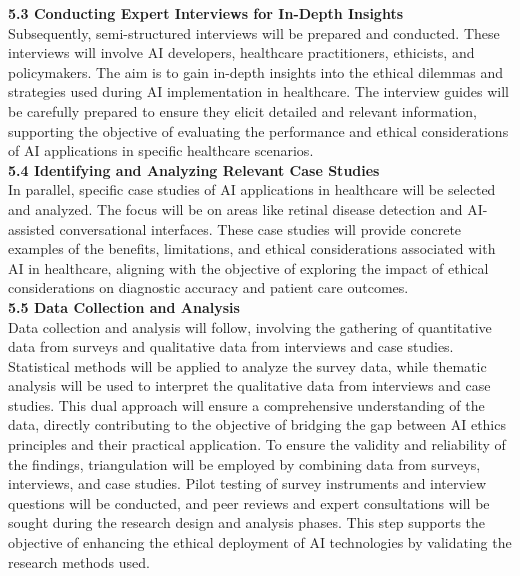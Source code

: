 \documentclass[a4paper, 12pt]{article}
\begin{document}
\textbf{5.3 \hspace{5mm} Conducting Expert Interviews for In-Depth Insights}\\
Subsequently, semi-structured interviews will be prepared and conducted. These interviews will involve AI developers, healthcare practitioners, ethicists, and policymakers. The aim is to gain in-depth insights into the ethical dilemmas and strategies used during AI implementation in healthcare. The interview guides will be carefully prepared to ensure they elicit detailed and relevant information, supporting the objective of evaluating the performance and ethical considerations of AI applications in specific healthcare scenarios.\\

\textbf{5.4 \hspace{5mm} Identifying and Analyzing Relevant Case Studies}\\
In parallel, specific case studies of AI applications in healthcare will be selected and analyzed. The focus will be on areas like retinal disease detection and AI-assisted conversational interfaces. These case studies will provide concrete examples of the benefits, limitations, and ethical considerations associated with AI in healthcare, aligning with the objective of exploring the impact of ethical considerations on diagnostic accuracy and patient care outcomes.\\

\textbf{5.5 \hspace{5mm} Data Collection and Analysis}\\
Data collection and analysis will follow, involving the gathering of quantitative data from surveys and qualitative data from interviews and case studies. Statistical methods will be applied to analyze the survey data, while thematic analysis will be used to interpret the qualitative data from interviews and case studies. This dual approach will ensure a comprehensive understanding of the data, directly contributing to the objective of bridging the gap between AI ethics principles and their practical application. To ensure the validity and reliability of the findings, triangulation will be employed by combining data from surveys, interviews, and case studies. Pilot testing of survey instruments and interview questions will be conducted, and peer reviews and expert consultations will be sought during the research design and analysis phases. This step supports the objective of enhancing the ethical deployment of AI technologies by validating the research methods used.\\
\end{document}
